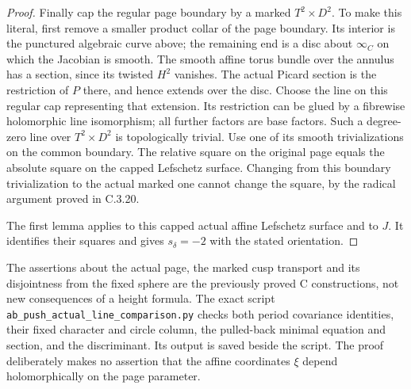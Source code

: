 \begin{proof}
Finally cap the regular page boundary by a marked
$T^2\times D^2$.  To make this literal, first remove a smaller
product collar of the page boundary.  Its interior is the
punctured algebraic curve above; the remaining end is a disc
about $\infty_C$ on which the Jacobian is smooth.  The smooth
affine torus bundle over the annulus has a section, since its
twisted $H^2$ vanishes.  The actual Picard section is the
restriction of $P$ there, and hence extends over the disc.
Choose the line on this regular cap representing that extension.
Its restriction can be glued by a fibrewise holomorphic line
isomorphism; all further factors are base factors.  Such a
degree-zero line over $T^2\times D^2$ is topologically trivial.
Use one of its smooth trivializations on the common boundary.
The relative square on the original page equals the absolute
square on the capped Lefschetz surface.  Changing from this
boundary trivialization to the actual marked one cannot change
the square, by the radical argument proved in C.3.20.

The first lemma applies to this capped actual affine Lefschetz
surface and to $J$.  It identifies their squares and gives
$s_\delta=-2$ with the stated orientation.
\end{proof}

\begin{remark}
The assertions about the actual page, the marked cusp transport
and its disjointness from the fixed sphere are the previously
proved C constructions, not new consequences of a height formula.
The exact script \texttt{ab\_push\_actual\_line\_comparison.py}
checks both period covariance identities, their fixed character
and circle column, the pulled-back minimal equation and section,
and the discriminant.  Its output is saved beside the script.
The proof deliberately makes no assertion that the affine
coordinates $\xi$ depend holomorphically on the page parameter.
\end{remark}
